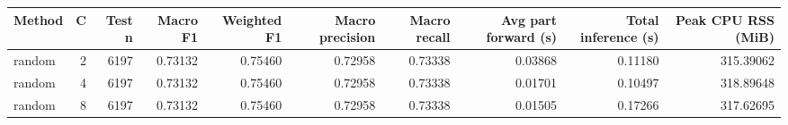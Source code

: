 \begin{tabular}{lrrrrrrrrr}
\toprule
Method & C & Test n & Macro F1 & Weighted F1 & Macro precision & Macro recall & Avg part forward (s) & Total inference (s) & Peak CPU RSS (MiB) \\
\midrule
random & 2 & 6197 & 0.73132 & 0.75460 & 0.72958 & 0.73338 & 0.03868 & 0.11180 & 315.39062 \\
random & 4 & 6197 & 0.73132 & 0.75460 & 0.72958 & 0.73338 & 0.01701 & 0.10497 & 318.89648 \\
random & 8 & 6197 & 0.73132 & 0.75460 & 0.72958 & 0.73338 & 0.01505 & 0.17266 & 317.62695 \\
\bottomrule
\end{tabular}
